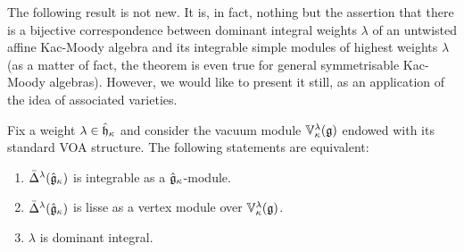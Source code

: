         The following result is not new. It is, in fact, nothing but the assertion that there is a bijective correspondence between dominant integral weights $\lambda$ of an untwisted affine Kac-Moody algebra and its integrable simple modules of highest weights $\lambda$ (as a matter of fact, the theorem is even true for general symmetrisable Kac-Moody algebras). However, we would like to present it still, as an application of the idea of associated varieties.
        \begin{proposition}
            Fix a weight $\lambda \in \hat{\mathfrak{h}}_{\kappa}$ and consider the vacuum module $\mathbb{V}_{\kappa}^{\lambda}(\mathfrak{g})$ endowed with its standard VOA structure. The following statements are equivalent:
            \begin{enumerate}
                \item $\bar{\Delta}^{\lambda}(\hat{\mathfrak{g}}_{\kappa})$ is integrable as a $\hat{\mathfrak{g}}_{\kappa}$-module.
                \item $\bar{\Delta}^{\lambda}(\hat{\mathfrak{g}}_{\kappa})$ is lisse as a vertex module over $\mathbb{V}_{\kappa}^{\lambda}(\mathfrak{g})$.
                \item $\lambda$ is dominant integral.
            \end{enumerate}
        \end{proposition}
